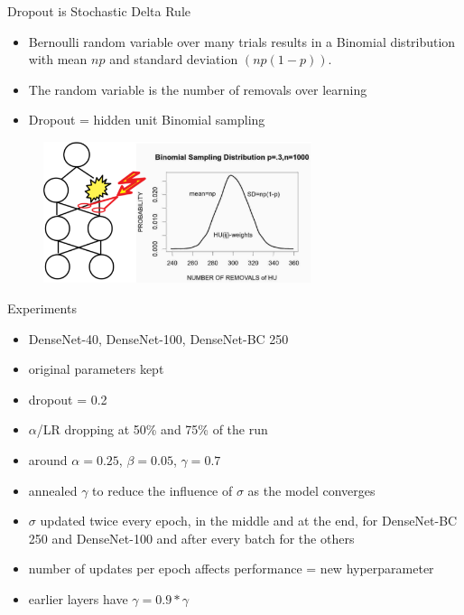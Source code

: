 \documentclass{beamer}
\begin{document}
\begin{frame}{Dropout is Stochastic Delta Rule}

\begin{itemize}
\item Bernoulli random variable over many trials results in a Binomial distribution with mean $np$ and standard deviation $(np(1-p))$. 
\item The random variable is the number of removals  over learning
\item Dropout = hidden unit Binomial sampling
\end{itemize}

\begin{figure}[h]
\includegraphics[width=0.7\textwidth]{img/dropout_sampling}
\end{figure}

\end{frame}
\begin{frame}{Experiments}

\begin{itemize}
\item DenseNet-40, DenseNet-100, DenseNet-BC 250
\item original parameters kept 
\item dropout = 0.2
\item $\alpha$/LR dropping at 50\% and 75\% of the run
\item around $\alpha=0.25$, $\beta= 0.05$, $\gamma= 0.7$
\item annealed $\gamma$ to reduce the influence of  $\sigma$ as the model converges
\item $\sigma$ updated twice every epoch, in the middle and at the end, for DenseNet-BC 250 and DenseNet-100 and after every batch for the others
\item number of updates per epoch affects performance = new hyperparameter
\item earlier layers have $\gamma=0.9 * \gamma$
\end{itemize}

\end{frame}
\end{document}
